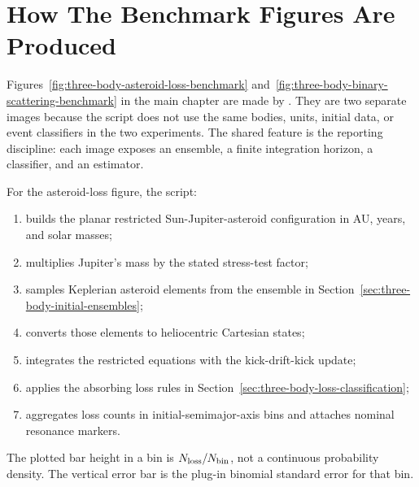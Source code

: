 \section{How The Benchmark Figures Are Produced}
\label{sec:three-body-benchmark-figure-protocol}

Figures~\ref{fig:three-body-asteroid-loss-benchmark}
and~\ref{fig:three-body-binary-scattering-benchmark} in the main chapter are
made by .  They are two
separate images because the script does not use the same bodies, units, initial
data, or event classifiers in the two experiments.  The shared feature is the
reporting discipline: each image exposes an ensemble, a finite integration
horizon, a classifier, and an estimator.

For the asteroid-loss figure, the script:
\begin{enumerate}
\item builds the planar restricted Sun-Jupiter-asteroid configuration in AU,
years, and solar masses;
\item multiplies Jupiter's mass by the stated stress-test factor;
\item samples Keplerian asteroid elements from the ensemble in
Section~\ref{sec:three-body-initial-ensembles};
\item converts those elements to heliocentric Cartesian states;
\item integrates the restricted equations with the kick-drift-kick update;
\item applies the absorbing loss rules in Section~\ref{sec:three-body-loss-classification};
\item aggregates loss counts in initial-semimajor-axis bins and attaches
nominal resonance markers.
\end{enumerate}
The plotted bar height in a bin is \(N_{\rm loss}/N_{\rm bin}\), not a
continuous probability density.  The vertical error bar is the plug-in binomial
standard error for that bin.

